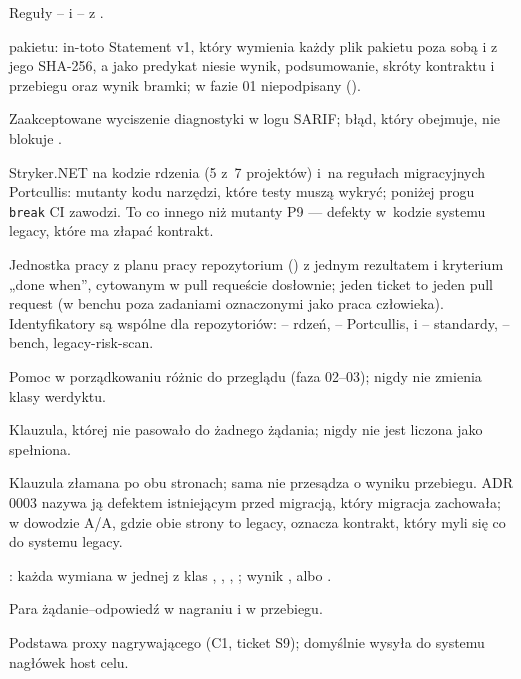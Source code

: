 \begin{description}[style=nextline, leftmargin=1.2em, font=\normalfont\bfseries]
  \item[standardy] Reguły -- i
        -- z .
  \item[statement in-toto]  pakietu: in-toto Statement v1, który
        wymienia każdy plik pakietu poza sobą i  z jego SHA-256,
        a jako predykat niesie wynik, podsumowanie, skróty kontraktu i przebiegu oraz wynik
        bramki; w fazie 01 niepodpisany ().
  \item[suppression] Zaakceptowane wyciszenie diagnostyki w logu SARIF; błąd, który obejmuje,
        nie blokuje .
  \item[testy mutacyjne] Stryker.NET na kodzie rdzenia (5 z~7 projektów) i~na regułach
        migracyjnych Portcullis: mutanty kodu narzędzi, które testy muszą wykryć; poniżej
        progu \texttt{break} CI zawodzi. To co innego niż mutanty P9 --- defekty w~kodzie
        systemu legacy, które ma złapać kontrakt.
  \item[ticket] Jednostka pracy z planu pracy repozytorium () z jednym
        rezultatem i kryterium „done when”, cytowanym w pull requeście dosłownie; jeden
        ticket to jeden pull request (w benchu poza zadaniami oznaczonymi jako praca
        człowieka). Identyfikatory są wspólne dla repozytoriów: --
        rdzeń, -- Portcullis, 
        i -- standardy, -- bench,
         legacy-risk-scan.
  \item[triage doradcza (C8)] Pomoc w porządkowaniu różnic do przeglądu (faza 02--03); nigdy
        nie zmienia klasy werdyktu.
  \item[unexercised] Klauzula, której  nie pasowało do żadnego żądania;
        nigdy nie jest liczona jako spełniona.
  \item[violated-both] Klauzula złamana po obu stronach; sama nie przesądza o wyniku
        przebiegu. ADR 0003 nazywa ją defektem istniejącym przed migracją, który migracja
        zachowała; w dowodzie A/A, gdzie obie strony to legacy, oznacza kontrakt, który myli
        się co do systemu legacy.
  \item[werdykt] : każda wymiana w jednej z klas ,
        , , ;
        wynik ,  albo .
  \item[wymiana (exchange)] Para żądanie--odpowiedź w nagraniu i w przebiegu.
  \item[YARP] Podstawa proxy nagrywającego  (C1, ticket S9); domyślnie
        wysyła do systemu nagłówek host celu.
\end{description}

